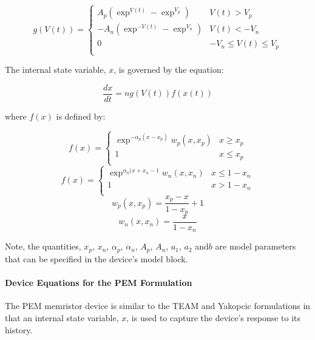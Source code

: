 \begin{equation}
g(V(t)) = \left\{  
  \begin{array}{ll}
    A_p\left( \exp^{V(t)} - \exp^{V_p}\right) & V(t) > V_p \\
    -A_n \left( \exp^{-V(t)} - \exp^{V_n}\right) & V(t) < -V_n \\
    0       & -V_n \le V(t) \le V_p \\
  \end{array}
  \right.
\end{equation}

The internal state variable, $x$, is governed by the equation:

\begin{equation}
\frac{dx}{dt} = n g(V(t)) f(x(t))
\end{equation}

where $f(x)$ is defined by:

\begin{equation}
f(x) = \left\{  
  \begin{array}{ll}
   \exp^{-\alpha_p (x-x_p)} w_p(x,x_p) & x \ge x_p \\
   1 & x \le x_p \\
  \end{array}
  \right.
\end{equation}
\begin{equation}
f(x) = \left\{  
  \begin{array}{ll}
   \exp^{\alpha_n (x+x_n-1} w_n(x,x_n) & x \le 1-x_n \\
   1 & x > 1 - x_n \\
  \end{array}
  \right.
\end{equation}
\begin{equation}
w_p(x,x_p) = \frac{x_p -x}{1 - x_p} + 1
\end{equation}
\begin{equation}
w_n(x,x_n) = \frac{x}{1-x_n}
\end{equation}

Note, the quantities, $x_p$, $x_n$, $\alpha_p$, $\alpha_n$, $A_p$, $A_n$, $a_1$, $a_2$ and$b$ are model
parameters that can be specified in the device's model block.


\paragraph{Device Equations for the PEM Formulation}
The PEM memristor device is similar to the TEAM and Yakopcic formulations in that an 
internal state variable, $x$, is used to capture the device's response to its history.

